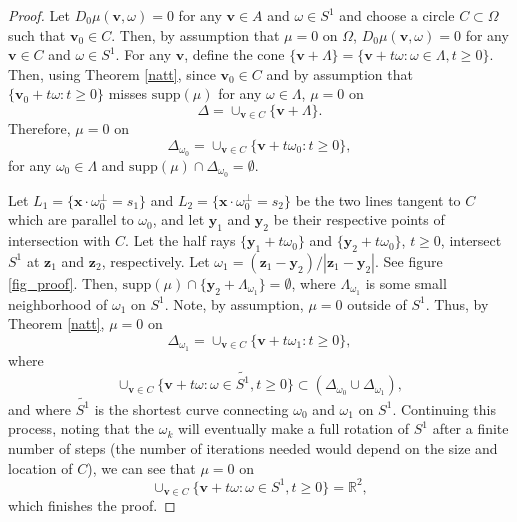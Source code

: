 \documentclass[a4paper,12pt]{amsart}
\numberwithin{equation}{section}
\theoremstyle{plain}
\numberwithin{theorem}{section}
\theoremstyle{definition}
\theoremstyle{remark}
\theoremstyle{remark}
\theoremstyle{remark}
\newcommand{\vv}{{\mathbf{v}}}
\newcommand{\vx}{{\mathbf{x}}}
\newcommand{\vy}{{\mathbf{y}}}
\newcommand{\vz}{{\mathbf{z}}}
\begin{document}
{\begin{proof}
Let $D_0\mu(\vv,\omega) = 0$ for any $\vv\in A$ and $\omega \in S^1$ and choose a circle $C \subset \Omega$ such that $\vv_0 \in C$. Then, by assumption that $\mu = 0$ on $\Omega$, $D_0\mu(\vv,\omega) = 0$ for any $\vv\in C$ and $\omega \in S^1$. For any $\vv$, define the cone $\{\vv + \Lambda\} = \{\vv + t\omega : \omega \in \Lambda, t\geq 0\}$. Then, using Theorem \ref{natt}, since $\vv_0 \in C$ and by assumption that $\{\vv_0 + t\omega : t\geq 0\}$ misses $\text{supp}(\mu)$ for any $\omega \in \Lambda$, $\mu = 0$ on 
$$\Delta = \cup_{\vv \in C} \{\vv + \Lambda\}.$$
Therefore, $\mu = 0$ on
$$\Delta_{\omega_0} = \cup_{\vv \in C} \{\vv + t\omega_0: t\geq 0\},$$
for any $\omega_0 \in \Lambda$ and $\text{supp}(\mu) \cap \Delta_{\omega_0} = \emptyset$.

Let $L_1 = \{\vx \cdot \omega^{\perp}_0 = s_1\}$ and $L_2 = \{\vx \cdot \omega^{\perp}_0 = s_2\}$ be the two lines tangent to $C$ which are parallel to $\omega_0$, and let $\vy_1$ and $\vy_2$ be their respective points of intersection with $C$. Let the half rays $\{\vy_1 + t\omega_0\}$ and $\{\vy_2 + t\omega_0\}$, $t\geq 0$, intersect $S^1$ at $\vz_1$ and $\vz_2$, respectively. Let $\omega_1 = (\vz_1 - \vy_2)/|\vz_1 - \vy_2|$. See figure \ref{fig_proof}. Then, $\text{supp}(\mu) \cap \{\vy_2 + \Lambda_{\omega_1}\} = \emptyset$, where $\Lambda_{\omega_1}$ is some small neighborhood of $\omega_1$ on $S^1$.  Note, by assumption, $\mu = 0$ outside of $S^1$. Thus, by Theorem \ref{natt}, $\mu = 0$ on 
$$\Delta_{\omega_1} = \cup_{\vv \in C} \{\vv + t\omega_1: t\geq 0\},$$
where 
$$\cup_{\vv \in C} \{\vv + t\omega : \omega \in \tilde{S^1}, t\geq 0 \} \subset (\Delta_{\omega_0} \cup \Delta_{\omega_1}),$$
and where $\tilde{S^1}$ is the shortest curve connecting $\omega_0$ and $\omega_1$ on $S^1$. Continuing this process, noting that the $\omega_k$ will eventually make a full rotation of $S^1$ after a finite number of steps (the number of iterations needed would depend on the size and location of $C$), we can see that $\mu = 0$ on 
$$\cup_{\vv \in C} \{\vv + t\omega : \omega \in S^1, t\geq 0\} = \mathbb{R}^2,$$
which finishes the proof.
\end{proof}

}
\end{document}
